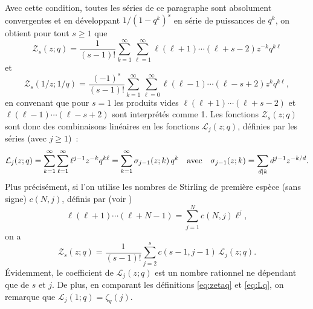 \documentclass[12pt]{amsart}
\newcommand{\io}{\infty}
\theoremstyle{remark}
\numberwithin{equation}{section}
\begin{document}
Avec cette condition, toutes les s{\'e}ries de ce paragraphe sont 
absolument convergentes et 
en d{\'e}veloppant  $1/(1- q^k)^s$ en
s{\'e}rie de puissances de $q^k$,  on obtient 
pour tout 
$s\ge 1$ que
\begin{equation} \label{eq:Zs}
\mathcal{Z}_s(z;q)=
\frac{1}{(s-1)!}\sum_{k= 1}^{\io}
\sum_{\ell=1}^{\io}\ell(\ell+1)\cdots (\ell+s-2)z^{-k} q^{k\ell} 
\end{equation}
et  
\begin{equation} \label{eq:Zs1/q}
\mathcal{Z}_s(1/z;1/q)=
\frac{(-1)^s}{(s-1)!}\sum_{k= 1}^{\io}
\sum_{\ell=0}^{\io}
\ell(\ell-1)\cdots (\ell-s+2)z^k q^{k\ell},
\end{equation}
en convenant que pour $s=1$ les produits vides
$\ell(\ell+1)\cdots(\ell+s-2)$ et 
$\ell(\ell-1)\cdots(\ell-s+2)$ sont interpr{\'e}t{\'e}s comme 1.
Les fonctions $\mathcal{Z}_{s}(z;q)$ sont donc des combinaisons 
lin{\'e}aires
en les fonctions 
$\mathcal{L}_j(z;q)$, 
d{\'e}finies par les s{\'e}ries (avec $j\ge1$)~:
\begin{equation} \label{eq:Lq}
\mathcal{L}_j(z;q)=\sum_{k=1}^{\io}\sum_{\ell=1}^{\io}\ell^{j-1} z^{-k} q^{k\ell} = 
\sum_{k=1}^{\io}\sigma_{j-1}(z;k)\,q^k \quad
\textup{avec} \quad \sigma_{j-1}(z;k)=\sum_{d\vert k}d^{j-1}z^{-k/d}.
\end{equation}
Plus pr{\'e}cis{\'e}ment, si l'on utilise les nombres de Stirling de premi{\`e}re
esp{\`e}ce (sans signe) $c(N,j)$, d{\'e}finis par (voir 
\cite[Sec.~1.3]{StanAP})
\begin{equation} \label{eq:Stirling1}
\ell(\ell+1)\cdots(\ell+N-1)=
\sum _{j=1} ^{N}c(N,j)\ell^j,
\end{equation}
on a
\begin{equation} \label{eq:Z->E}
\mathcal Z_s(z;q)=\frac {1} {(s-1)!}
\sum _{j=2} ^{s}c(s-1,j-1)\,\mathcal L_j(z;q).
\end{equation}
{\'E}videmment, le coefficient de $\mathcal L_j(z;q)$ est un nombre
rationnel ne d{\'e}pendant que de $s$ et $j$.
De plus, en comparant les d{\'e}finitions \eqref{eq:zetaq} et
\eqref{eq:Lq}, on remarque que $\mathcal 
L_j(1;q)=\zeta_q(j)$.
\end{document}

